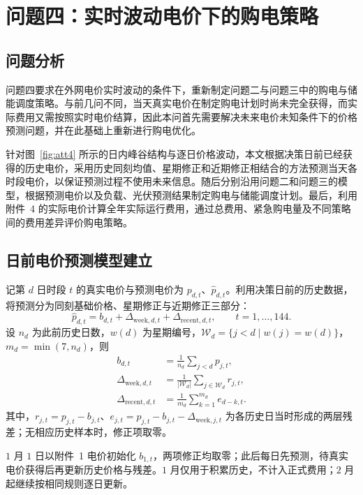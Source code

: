 \section{问题四：实时波动电价下的购电策略}

\subsection{问题分析}

问题四要求在外网电价实时波动的条件下，重新制定问题二与问题三中的购电与储能调度策略。与前几问不同，当天真实电价在制定购电计划时尚未完全获得，而实际费用又需按照实时电价结算，因此本问首先需要解决未来电价未知条件下的价格预测问题，并在此基础上重新进行购电优化。

针对图~\ref{fig:att4} 所示的日内峰谷结构与逐日价格波动，本文根据决策日前已经获得的历史电价，采用历史同刻均值、星期修正和近期修正相结合的方法预测当天各时段电价，以保证预测过程不使用未来信息。随后分别沿用问题二和问题三的模型，根据预测电价以及负载、光伏预测结果制定购电与储能调度计划。最后，利用附件~4 的实际电价计算全年实际运行费用，通过总费用、紧急购电量及不同策略间的费用差异评价购电策略。

\subsection{日前电价预测模型建立}

记第 $d$ 日时段 $t$ 的真实电价与预测电价为 $p_{d,t}$、$\hat p_{d,t}$。利用决策日前的历史数据，将预测分为同刻基础价格、星期修正与近期修正三部分：
\begin{equation}
  \hat p_{d,t}=b_{d,t}+\Delta_{\mathrm{week},d,t}+\Delta_{\mathrm{recent},d,t},
  \qquad t=1,\ldots,144.
  \label{eq:q4_price_forecast}
\end{equation}
设 $n_d$ 为此前历史日数，$w(d)$ 为星期编号，$\mathcal W_d=\{j<d\mid w(j)=w(d)\}$，$m_d=\min(7,n_d)$，则
\begin{align}
  b_{d,t}&=\frac{1}{n_d}\sum_{j<d}p_{j,t}, \label{eq:q4_price_base}\\
  \Delta_{\mathrm{week},d,t}&=\frac{1}{|\mathcal W_d|}\sum_{j\in\mathcal W_d}r_{j,t}, \label{eq:q4_week_correction}\\
  \Delta_{\mathrm{recent},d,t}&=\frac{1}{m_d}\sum_{k=1}^{m_d}e_{d-k,t}. \label{eq:q4_recent_correction}
\end{align}
其中，$r_{j,t}=p_{j,t}-b_{j,t}$、$e_{j,t}=p_{j,t}-b_{j,t}-\Delta_{\mathrm{week},j,t}$ 为各历史日当时形成的两层残差；无相应历史样本时，修正项取零。

$1$ 月 $1$ 日以附件~1 电价初始化 $b_{1,t}$，两项修正均取零；此后每日先预测，待真实电价获得后再更新历史价格与残差。$1$ 月仅用于积累历史，不计入正式费用；$2$ 月起继续按相同规则逐日更新。

